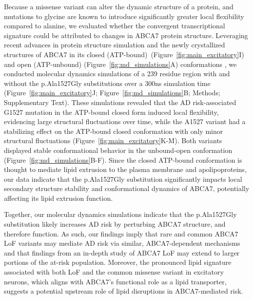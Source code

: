 Because a missense variant can alter the dynamic structure of a protein, and mutations to glycine are known to introduce significantly greater local flexibility compared to alanine, we evaluated whether the convergent transcriptional signature could be attributed to changes in ABCA7 protein structure. Leveraging recent advances in protein structure simulation and the newly crystallized structures of ABCA7 in its closed (ATP-bound)  (Figure~\ref{fig:main_excitatory}I) and open (ATP-unbound) (Figure~\ref{fig:md_simulations}A) conformations\cite{Le_Thi_My2022-dp,Jumper2021-na} , we conducted molecular dynamics simulations of a 239 residue region with and without the p.Ala1527Gly substitutions over a 300ns simulation time (Figure~\ref{fig:main_excitatory}J; Figure~\ref{fig:md_simulations}B; Methods; Supplementary Text). These simulations revealed that the AD risk-associated G1527 mutation in the ATP-bound closed form induced local flexibility, evidencing large structural fluctuations over time, while the A1527 variant had a stabilizing effect on the ATP-bound closed conformation with only minor structural fluctuations (Figure~\ref{fig:main_excitatory}K-M). Both variants displayed stable conformational behavior in the unbound-open conformation (Figure~\ref{fig:md_simulations}B-F). Since the closed ATP-bound conformation is thought to mediate lipid extrusion to the plasma membrane and apolipoproteins\cite{Le_Thi_My2022-dp}, our data indicate that the p.Ala1527Gly substitution significantly impacts local secondary structure  stability and conformational dynamics of ABCA7, potentially affecting its lipid extrusion function.  

Together, our molecular dynamics simulations indicate that the p.Ala1527Gly substitution likely increases AD risk by perturbing ABCA7 structure, and therefore function. As such, our findings imply that rare and common ABCA7 LoF variants may mediate AD risk via similar, ABCA7-dependent mechanisms  and that findings from an in-depth study of ABCA7 LoF may extend to larger portions of the at-risk population. Moreover, the pronounced lipid signature associated with both LoF and the common missense variant in excitatory neurons, which aligns with ABCA7's functional role as a lipid transporter, suggests a potential upstream role of lipid disruptions in ABCA7-mediated risk.  

